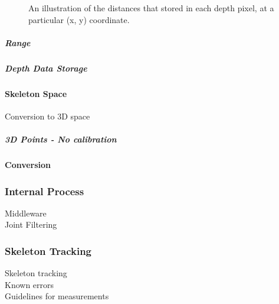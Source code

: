 \begin{figure}[ht]
	\centering
	{%
		\setlength{\fboxsep}{0pt}%
		\setlength{\fboxrule}{0.5pt}%
		}
	\caption{An illustration of the distances that stored in each depth pixel, at a particular (x, y) coordinate. \cite{msdnCoSpaces2017}}
	\label{fig:distanceToDepthSpace}
\end{figure}

\subparagraph{Range}

\subparagraph{Depth Data Storage}

\paragraph{Skeleton Space}

Conversion to 3D space \cite{nonContact2017}\\

\subparagraph{3D Points - No calibration}

\paragraph{Conversion}

\subsubsection{Internal Process}
Middleware \cite{nonContact2017}\\
Joint Filtering\\

\subsubsection{Skeleton Tracking}
Skeleton tracking\\
Known errors\\
Guidelines for measurements\\

